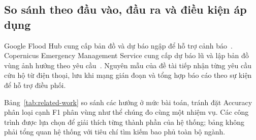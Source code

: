 \subsection{So sánh theo đầu vào, đầu ra và điều kiện áp dụng}
Google Flood Hub cung cấp bản đồ và dự báo ngập để hỗ trợ cảnh báo~\citep{googleFloodHub}. Copernicus Emergency Management Service cung cấp dự báo lũ và lập bản đồ vùng ảnh hưởng theo yêu cầu~\citep{copernicusEMSAbout}. Nguyên mẫu của đề tài tiếp nhận từng yêu cầu cứu hộ từ điện thoại, lưu khi mạng gián đoạn và tổng hợp báo cáo theo sự kiện để hỗ trợ điều phối.

Bảng~\ref{tab:related-work} so sánh các hướng ở mức bài toán, tránh đặt Accuracy phân loại cạnh F1 phân vùng như thể chúng đo cùng một nhiệm vụ. Các công trình được lựa chọn để giải thích từng thành phần của hệ thống; bảng không phải tổng quan hệ thống với tiêu chí tìm kiếm bao phủ toàn bộ ngành.


